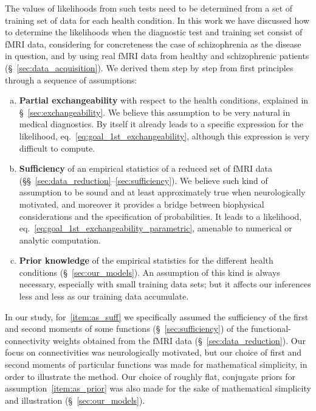 \documentclass[%
]{frontiersSCNS-nologo} %
\newcommand*{\sect}{\S} %
\newcommand*{\sects}{\S\S} %
\newcommand*{\eqn}{eq.}
\renewcommand*{\|}{\mathpunct{|}}%
\begin{document}
The values of likelihoods from such tests need to be determined from a set
of training set of data for each health condition. In this work we have
discussed how to determine the likelihoods when the diagnostic test and
training set consist of fMRI data, considering for concreteness the case of
schizophrenia as the disease in question, and by using real fMRI data from
healthy and schizophrenic patients (\sect~\ref{sec:data_acquisition}). We
derived them step by step from first principles through a sequence of
assumptions:
\begin{enumerate}[(a)]
\item\label{item:as_exchang}\textbf{Partial exchangeability} with respect
  to the health conditions, explained in \sect~\ref{sec:exchangeability}.
  We believe this assumption to be very natural in medical diagnostics. By
  itself it already leads to a specific expression for the likelihood,
  \eqn~\eqref{eq:goal_1st_exchangeability}, although this expression is
  very difficult to compute.
\item\label{item:as_suff}\textbf{Sufficiency} of an empirical statistics of
  a reduced set of fMRI data
  (\sects~\ref{sec:data_reduction}--\ref{sec:sufficiency}). We believe such
  kind of assumption to be sound and at least approximately true when
  neurologically motivated, and moreover it provides a bridge between
  biophysical considerations and the specification of probabilities. It
  leads to a likelihood,
  \eqn~\eqref{eq:goal_1st_exchangeability_parametric}, amenable to
  numerical or analytic computation.
\item\label{item:as_prior}\textbf{Prior knowledge} of the empirical
  statistics for the different health conditions
  (\sect~\ref{sec:our_models}). An assumption of this kind is always
  necessary, especially with small training data sets; but it affects our
  inferences less and less as our training data accumulate.
\end{enumerate}
In our study, for~\ref{item:as_suff} we specifically assumed the
sufficiency of the first and second moments of some functions
(\sect~\ref{sec:sufficiency}) of the functional-connectivity weights
obtained from the fMRI data (\sect~\ref{sec:data_reduction}). Our focus on
connectivities was neurologically motivated, but our choice of first and
second moments of particular functions was made for mathematical
simplicity, in order to illustrate the method. Our choice of roughly flat,
conjugate priors for assumption~\ref{item:as_prior} was also made for the sake of
mathematical simplicity and illustration (\sect~\ref{sec:our_models}).
\end{document}
